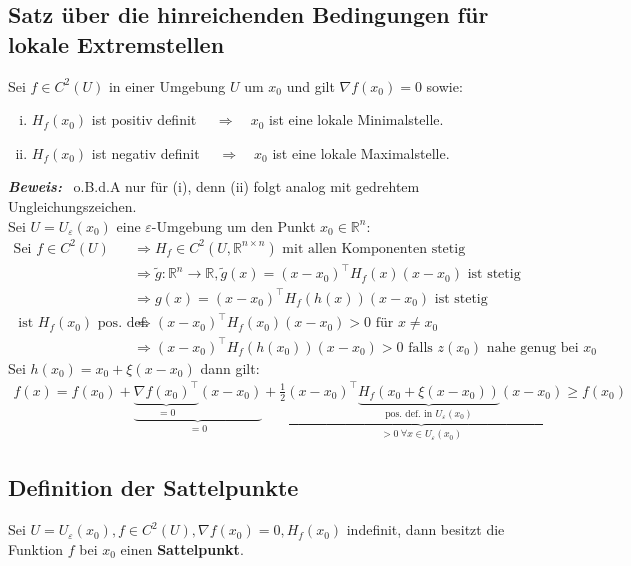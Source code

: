 \documentclass[11pt,a4paper]{book}
\newcommand {\R}	{\mathbb{R}}
\newcommand {\Rn}	{\mathbb{R}^n}
\newcommand {\Rnxn}	{\mathbb{R}^{n \times n}}
\newcommand{\1}    	{\mathbbm{1}}
\newcommand{\Beweis}[1][Beweis]
{\begin{mdframed}[backgroundcolor=gray!10,linewidth=0pt]\noindent\textit{\textbf{{#1}:}}~}
\newcommand{\QED}	{\end{mdframed}}
\begin{document}
\subsection{Satz über die hinreichenden Bedingungen für lokale Extremstellen}
Sei \(f \in C^2(U)\) in einer Umgebung \(U\) um \(x_0\) und gilt \(\nabla f(x_0) = 0\) sowie:
\begin{enumerate}[(i)]
	\item \(H_f(x_0)\) ist positiv definit \(\quad\Rightarrow\quad x_0\) ist eine lokale Minimalstelle.
	\item \(H_f(x_0)\) ist negativ definit \(\quad\Rightarrow\quad x_0\) ist eine lokale Maximalstelle.
\end{enumerate}

\Beweis
o.B.d.A nur für (i), denn (ii) folgt analog mit gedrehtem Ungleichungszeichen.\\
Sei \(U = U_\varepsilon(x_0)\) eine \(\varepsilon\)-Umgebung um den Punkt \(x_0 \in \Rn\):
\begin{align*}
	\textrm{Sei } f \in C^2(U) 
	&\Rightarrow H_f \in C^2(U,\Rnxn) \textrm{ mit allen Komponenten stetig} \\
	&\Rightarrow \tilde{g}:\Rn \rightarrow \R, \tilde{g}(x) = (x - x_0)^\top H_f(x) (x - x_0) \textrm{ ist stetig} \\
	&\Rightarrow g(x) = (x - x_0)^\top H_f(h(x)) (x - x_0) \textrm{ ist stetig} \\
	\textrm{ ist }H_f(x_0)\textrm{ pos. def.} 
	&\Rightarrow (x-x_0)^\top H_f(x_0) (x-x_0) > 0 \textrm{ für } x \neq x_0 \\
	&\Rightarrow (x-x_0)^\top H_f(h(x_0)) (x-x_0) > 0 \textrm{ falls }z(x_0)\textrm{ nahe genug bei }x_0	
\end{align*}
Sei \(h(x_0) = x_0 + \xi(x - x_0)\) dann gilt:
\begin{align*}
	f(x) = f(x_0) + 
	\underbrace{
		\underbrace{
			\nabla f(x_0)^\top
		}_{=0}
		(x-x_0)
	}_{=0}		
	+
	\underbrace{
		\frac{1}{2}(x-x_0)^\top
		\underbrace{
			H_f(x_0 + \xi(x - x_0))
		}_{\textrm{pos. def. in } U_\varepsilon(x_0)}
		(x-x_0)
	}_{> 0 ~ \forall x \in U_\varepsilon(x_0)}
	\geqslant f(x_0)
\end{align*}
\QED

\subsection{Definition der Sattelpunkte}
Sei \(U = U_\varepsilon(x_0), f \in C^2(U), \nabla f(x_0) = 0, H_f(x_0)\) indefinit, dann besitzt die Funktion \(f\) bei \(x_0\) einen \textbf{Sattelpunkt}.\\
\end{document}
